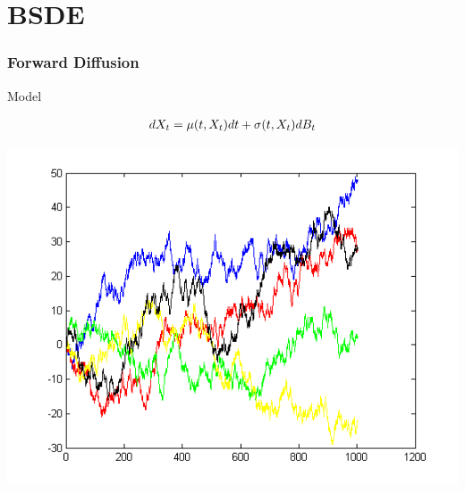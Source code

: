\documentclass[10pt]{beamer}
\begin{document}
 
 
 \section{BSDE}
 
 \begin{frame} 
 	
 	
 	\frametitle{Forward Diffusion}
 	
 	
 	
 	\begin{block}{Model}
 		
 			\begin{eqnarray}
 			dX_t = \mu(t,X_t)dt + \sigma (t, X_t) dB_t\notag
 			\end{eqnarray}
 			
 	\end{block}
 	
 	\pause
 	
 	
 	\centering
 	\includegraphics[scale=0.4]{random_walk.png}
 	
 \end{frame}
 
 
 
\end{document}
